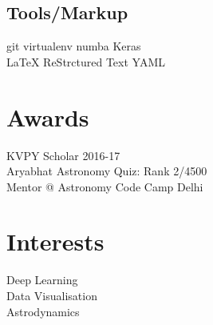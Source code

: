 \documentclass[a4paper]{deedy-resume-openfont}
\begin{document}
\begin{minipage}[t]{0.33\textwidth}
\subsection{Tools/Markup}
git \textbullet{}  virtualenv \textbullet{} numba \textbullet{} Keras \\
\LaTeX \textbullet{} ReStrctured Text \textbullet{} YAML\\
\section{Awards}
KVPY Scholar 2016-17\\
Aryabhat Astronomy Quiz: Rank 2/4500\\
Mentor @ Astronomy Code Camp Delhi

\section{Interests}
Deep Learning\\
Data Visualisation\\
Astrodynamics

%
%

\end{minipage} 
\hfill
\end{document}
